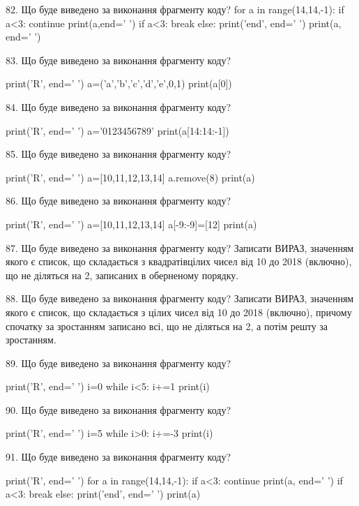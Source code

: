 \documentclass[11pt]{article}
\begin{document}

82. Що буде виведено за виконання фрагменту коду?
for a in range(14,14,-1):
    if a<3:
        continue
        print(a,end=' ')
    if a<3:
        break
else:
    print('end', end=' ')
print(a, end=' ')


83. Що буде виведено за виконання фрагменту коду?

print('R', end=' ')
a=('a','b','c','d','e',0,1)
print(a[0])



84. Що буде виведено за виконання фрагменту коду?

print('R', end=' ')
a='0123456789'
print(a[14:14:-1])



85. Що буде виведено за виконання фрагменту коду?

print('R', end=' ')
a=[10,11,12,13,14]
a.remove(8)
print(a)



86. Що буде виведено за виконання фрагменту коду?

print('R', end=' ')
a=[10,11,12,13,14]
a[-9:-9]=[12]
print(a)



87. Що буде виведено за виконання фрагменту коду?
Записати ВИРАЗ, значенням якого є список, що складається з квадратівцілих чисел від 10 до 2018 (включно), що не діляться на 2, записаних в оберненому порядку.

88. Що буде виведено за виконання фрагменту коду?
Записати ВИРАЗ, значенням якого є список, що складається з цілих чисел від 10 до 2018 (включно), причому спочатку за зростанням записано всі, що не діляться на 2, а потім решту за зростанням.

89. Що буде виведено за виконання фрагменту коду?

print('R', end=' ')
i=0
while i<5:
    i+=1
print(i)



90. Що буде виведено за виконання фрагменту коду?

print('R', end=' ')
i=5
while i>0:
    i+=-3
print(i)



91. Що буде виведено за виконання фрагменту коду?

print('R', end=' ')
for a in range(14,14,-1):
    if a<3:
        continue
        print(a, end=' ')
    if a<3:
        break
    else:
        print('end', end=' ')
    print(a)
\end{document}
